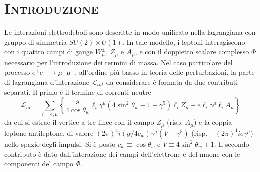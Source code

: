 \documentclass[11pt]{article}
\begin{document}
    \section{\centering\textsc{Introduzione} } %
    Le interazioni elettrodeboli sono descritte in modo unificato nella lagrangiana con gruppo di simmetria $SU(2)\times U(1)$. In tale modello, i leptoni interagiscono con i quattro campi di gauge 
    $W^\pm_\mu$, $Z_\mu$ e $A_\mu$, e con il doppietto scalare complesso $\Phi$ necessario per l'introduzione dei termini di massa. Nel caso particolare del processo $e^+e^-\to\mu^+\mu^-$, all'ordine più basso in teoria delle perturbazioni, 
    la parte di lagrangiana d'interazione $\mathcal{L}_{int}$ da considerare è formata da due contributi separati. Il primo è il termine di correnti neutre
    \begin{equation}
    \mathcal{L}_{nc}=\sum_{i=e,\mu}\left\{\frac{g}{4\cos\theta_w}\bar{\ell}_i\gamma^\mu(4\sin^2\theta_w-1+\gamma^5)\ell_iZ_\mu-e\bar{\ell}_i\gamma^\mu\ell_iA_\mu\right\}
    \end{equation}
    da cui si estrae il vertice a tre linee con il campo $Z_\mu$ (risp. $A_\mu$) e la coppia leptone-antileptone, di valore $(2\pi)^4i(g/4c_w)\gamma^\mu(V+\gamma^5)$ (risp. $-(2\pi)^4ie\gamma^\mu$) nello spazio degli impulsi. Si è posto $c_w\equiv\cos\theta_w$ e $V\equiv4\sin^2\theta_w+1$.
    Il secondo contributo è dato dall'interazione dei campi dell'elettrone e del muone con le componenti del campo $\Phi$.

\end{document}
